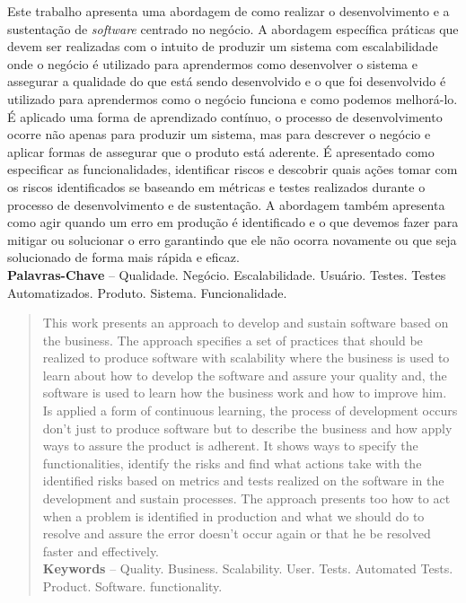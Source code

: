 \begin{resumo}
  Este trabalho apresenta uma abordagem de como realizar o desenvolvimento e
  a sustentação de \textit{software} centrado no negócio. A abordagem específica
  práticas que devem ser realizadas com o intuito de produzir um sistema com
  escalabilidade onde o negócio é utilizado para aprendermos como desenvolver o sistema
  e assegurar a qualidade do que está sendo desenvolvido e o que foi desenvolvido
  é utilizado para aprendermos como o negócio funciona e como podemos melhorá-lo.
  É aplicado uma forma de aprendizado contínuo, o processo de desenvolvimento ocorre
  não apenas para produzir um sistema, mas para descrever o negócio e aplicar
  formas de assegurar que o produto está aderente. É apresentado como especificar
  as funcionalidades, identificar riscos e descobrir quais ações tomar com os riscos
  identificados se baseando em métricas e testes realizados durante o processo
  de desenvolvimento e de sustentação. A abordagem também apresenta como agir
  quando um erro em produção é identificado e o que devemos fazer para mitigar
  ou solucionar o erro garantindo que ele não ocorra novamente ou que seja solucionado
  de forma mais rápida e eficaz. \\[3\baselineskip]

  \textbf{Palavras-Chave} -- Qualidade. Negócio. Escalabilidade. Usuário. Testes.
  Testes Automatizados. Produto. Sistema. Funcionalidade.
\end{resumo}

\begin{abstract}
  This work presents an approach to develop and sustain software based on the
  business. The approach specifies a set of practices that should be realized to
  produce software with scalability where the business is used to learn about how
  to develop the software and assure your quality and, the software is used to learn
  how the business work and how to improve him. Is applied a form of continuous
  learning, the process of development occurs don't just to produce software but
  to describe the business and how apply ways to assure the product is adherent.
  It shows ways to specify the functionalities, identify the risks and find what
  actions take with the identified risks based on metrics and tests realized on
  the software in the development and sustain processes. The approach presents too
  how to act when a problem is identified in production and what we should do to
  resolve and assure the error doesn't occur again or that he be resolved faster
  and effectively. \\[3\baselineskip]

  \textbf{Keywords} -- Quality. Business. Scalability. User. Tests.
  Automated Tests. Product. Software. functionality.
\end{abstract}
